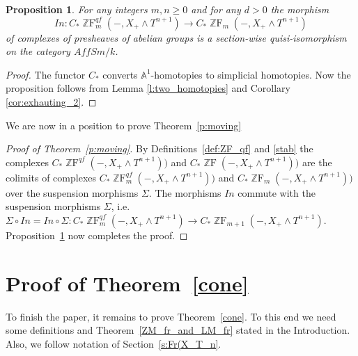 \documentclass[a4paper,11pt,reqno]{amsart}
\newtheorem{proposition}[theorem]{Proposition}
\begin{document}
\begin{proposition}\label{ZF_qf_and_ZF}
For any integers $m,n{\geqslant} 0$ and for any $d>0$ the morphism
$$In: C_*{\operatorname{\mathbb{Z}F}}^{qf}_m(-,X_+\wedge T^{n+1}) \to C_*{\operatorname{\mathbb{Z}F}}_m(-,X_+\wedge T^{n+1})$$
of complexes of presheaves of abelian groups is a section-wise quisi-isomorphism
on the category $AffSm/k$.
\end{proposition}

\begin{proof}
The functor $C_*$ converts ${\mathbb{A}}^1$-homotopies to simplicial homotopies.
Now the proposition follows from Lemma \ref{l:two_homotopies}
and Corollary \ref{cor:exhauting_2}.
\end{proof}

We are now in a position to prove Theorem~\ref{p:moving}

\begin{proof}[Proof of Theorem~\ref{p:moving}]
By Definitions~\ref{def:ZF_qf} and \ref{stab} the complexes
$C_*{\operatorname{\mathbb{Z}F}}^{qf}(-,X_+\wedge T^{n+1}))$ and $C_*{\operatorname{\mathbb{Z}F}}(-,X_+\wedge
T^{n+1}))$ are the colimits of complexes $C_*{\operatorname{\mathbb{Z}F}}^{qf}_m(-,X_+\wedge
T^{n+1}))$ and $C_*{\operatorname{\mathbb{Z}F}}_m(-,X_+\wedge T^{n+1}))$ over the suspension
morphisms $\Sigma$. The morphisms $In$ commute with the suspension
morphisms $\Sigma$, i.e. $\Sigma \circ In=In\circ \Sigma:
C_*{\operatorname{\mathbb{Z}F}}^{qf}_m(-,X_+\wedge T^{n+1})\to C_*{\operatorname{\mathbb{Z}F}}_{m+1}(-,X_+\wedge
T^{n+1})$. Proposition~\ref{ZF_qf_and_ZF} now completes the proof.
\end{proof}

\section{Proof of Theorem~\ref{cone}}\label{sec:cone}

To finish the paper, it remains to prove Theorem~\ref{cone}. To this
end we need some definitions and Theorem~\ref{ZM_fr_and_LM_fr} stated in the Introduction.
Also, we follow notation of Section~\ref{s:Fr(X_T_n}.
\end{document}
